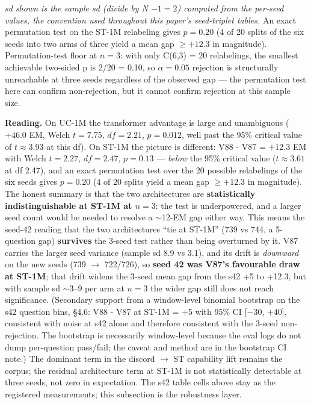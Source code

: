 \documentclass[11pt]{article}
\begin{document}
\emph{sd shown is the sample sd (divide by N $- 1 = 2$) computed from the per-seed values, the convention used throughout this paper's seed-triplet tables.} An exact permutation test on the ST-1M relabeling gives $p = 0.20$ (4 of 20 splits of the six seeds into two arms of three yield a mean gap $\geq +12.3$ in magnitude). Permutation-test floor at $n = 3$: with only C(6,3) = 20 relabelings, the smallest achievable two-sided p is 2/20 = 0.10, so $\alpha = 0.05$ rejection is structurally unreachable at three seeds regardless of the observed gap --- the permutation test here can confirm non-rejection, but it cannot confirm rejection at this sample size.

\textbf{Reading.} On UC-1M the transformer advantage is large and unambiguous ($+46.0$ EM, Welch $t = 7.75$, $df = 2.21$, $p = 0.012$, well past the 95\% critical value of $t \approx 3.93$ at this df). On ST-1M the picture is different: V88 - V87 = $+12.3$ EM with Welch $t = 2.27$, $df = 2.47$, $p = 0.13$ --- \emph{below} the 95\% critical value ($t \approx 3.61$ at df 2.47), and an exact permutation test over the 20 possible relabelings of the six seeds gives $p = 0.20$ (4 of 20 splits yield a mean gap $\geq +12.3$ in magnitude). The honest summary is that the two architectures are \textbf{statistically indistinguishable at ST-1M at $n = 3$}: the test is underpowered, and a larger seed count would be needed to resolve a $\sim$12-EM gap either way. This means the seed-42 reading that the two architectures ``tie at ST-1M'' (739 vs 744, a 5-question gap) \textbf{survives} the 3-seed test rather than being overturned by it. V87 carries the larger seed variance (sample sd 8.9 vs 3.1), and its drift is \emph{downward} on the new seeds (739 $\to$ 722/726), so \textbf{seed 42 was V87's favourable draw at ST-1M}; that drift widens the 3-seed mean gap from the s42 +5 to +12.3, but with sample sd $\sim$3--9 per arm at $n = 3$ the wider gap still does not reach significance. (Secondary support from a window-level binomial bootstrap on the s42 question bins, \S4.6: V88 - V87 at ST-1M = +5 with 95\% CI [$-30$, $+40$], consistent with noise at s42 alone and therefore consistent with the 3-seed non-rejection. The bootstrap is necessarily window-level because the eval logs do not dump per-question pass/fail; the caveat and method are in the bootstrap CI note.) The dominant term in the discord $\to$ ST capability lift remains the corpus; the residual architecture term at ST-1M is not statistically detectable at three seeds, not zero in expectation. The s42 table cells above stay as the registered measurements; this subsection is the robustness layer.
\end{document}
